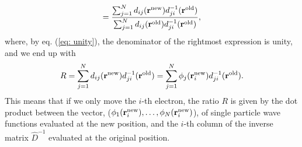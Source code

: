 \documentclass[../main.tex]{subfiles}
\begin{document}
\begin{appendices}
\begin{align}
    = \frac{\sum_{j=1}^N d_{ij}({\bf r}^{\textrm{new}}) d_{ji}^{-1}({\bf r}^{\textrm{old}})}{\sum_{j=1}^N d_{ij}({\bf r}^{\textrm{old}}) d_{ji}^{-1}({\bf r}^{\textrm{old}})},
\end{align}
where, by eq. (\ref{eq: unity}), the denominator of the rightmost expression is unity, and we end up with
\begin{align}
    R = \sum_{j=1}^N d_{ij}({\bf r}^{\textrm{new}}) d_{ji}^{-1}({\bf r}^{\textrm{old}}) = \sum_{j=1}^N \phi_j({\bf r}_i^{\textrm{new}}) d_{ji}^{-1}({\bf r}^{\textrm{old}}).
\end{align}
This means that if we only move the $i$-th electron, the ratio $R$ is given by the dot product between the vector, ($\phi_1({\bf r}_i^{\textrm{new}}),\dots,\phi_N({\bf r}_i^{\textrm{new}})$), of single particle wave functions evaluated at the new position, and the $i$-th column of the inverse matrix $\hat{D}^{-1}$ evaluated at the original position.


\end{appendices}
\end{document}
